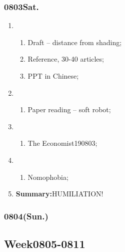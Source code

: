 \subsubsection{0803Sat.}
\begin{enumerate}
	\item \ncquaone
	\begin{enumerate}[(1)]
		\item Draft -- distance from shading;\rightundoneBlack
		\item Reference, 30-40 articles;\rightundoneBlack
		\item PPT in Chinese;\rightundoneBlack
	\end{enumerate}
	
	\item \ncquatwo	
	\begin{enumerate}[(1)]
		\item Paper reading -- soft robot;\rightundoneBlack
	\end{enumerate}
	
	\item \ncquathree
	\begin{enumerate}[(1)]
		\item The Economist190803;\rightdone
	\end{enumerate}
	
	\item \ncquafour	
	\begin{enumerate}[(1)]
		\item Nomophobia;\rightundoneBlack
	\end{enumerate}
	\item \textbf{Summary:}HUMILIATION! 
\end{enumerate}
\subsubsection{0804(Sun.)}
\subsection{Week0805-0811} 
